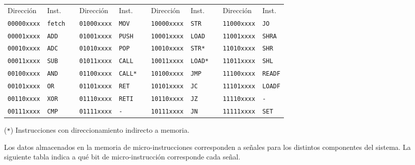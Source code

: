 \documentclass[a4paper,11pt]{article}
\begin{document}
\small
\begin{center}
\begin{tabular}[t]{l|lcl|lcl|lcl|l}
Dirección          & Inst.         & & Dirección          & Inst.         & & Dirección          & Inst.         & & Dirección          & Inst.         \\  
\cline{1-2} \cline{4-5} \cline{7-8} \cline{10-11}
\texttt{00000xxxx} & \texttt{fetch}& & \texttt{01000xxxx} & \texttt{MOV}  & & \texttt{10000xxxx} & \texttt{STR}  & & \texttt{11000xxxx} & \texttt{JO}   \\
\texttt{00001xxxx} & \texttt{ADD}  & & \texttt{01001xxxx} & \texttt{PUSH} & & \texttt{10001xxxx} & \texttt{LOAD} & & \texttt{11001xxxx} & \texttt{SHRA} \\
\texttt{00010xxxx} & \texttt{ADC}  & & \texttt{01010xxxx} & \texttt{POP}  & & \texttt{10010xxxx} & \texttt{STR*} & & \texttt{11010xxxx} & \texttt{SHR}  \\
\texttt{00011xxxx} & \texttt{SUB}  & & \texttt{01011xxxx} & \texttt{CALL} & & \texttt{10011xxxx} & \texttt{LOAD*}& & \texttt{11011xxxx} & \texttt{SHL}  \\
\texttt{00100xxxx} & \texttt{AND}  & & \texttt{01100xxxx} & \texttt{CALL*}& & \texttt{10100xxxx} & \texttt{JMP}  & & \texttt{11100xxxx} & \texttt{READF}\\
\texttt{00101xxxx} & \texttt{OR}   & & \texttt{01101xxxx} & \texttt{RET}  & & \texttt{10101xxxx} & \texttt{JC}   & & \texttt{11101xxxx} & \texttt{LOADF}\\
\texttt{00110xxxx} & \texttt{XOR}  & & \texttt{01110xxxx} & \texttt{RETI} & & \texttt{10110xxxx} & \texttt{JZ}   & & \texttt{11110xxxx} & \texttt{-}    \\
\texttt{00111xxxx} & \texttt{CMP}  & & \texttt{01111xxxx} & \texttt{-}    & & \texttt{10111xxxx} & \texttt{JN}   & & \texttt{11111xxxx} & \texttt{SET}  \\
\end{tabular}
\end{center}
(\texttt{*}) Instrucciones con direccionamiento indirecto a memoria.
\normalsize

\bigskip

Los datos almacenados en la memoria de micro-instrucciones corresponden a señales para los distintos componentes del sistema.
La siguiente tabla indica a qué bit de micro-instrucción corresponde cada señal.
\end{document}
